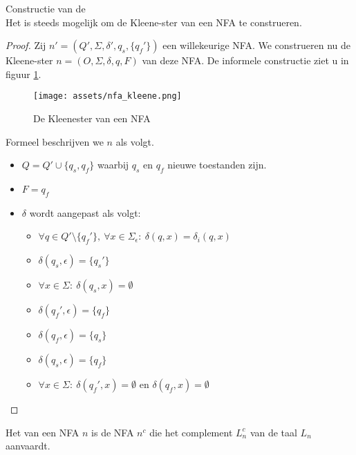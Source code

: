 \documentclass[main.tex]{subfiles}
\begin{document}
\begin{st}
  \label{st:ster-nfa}
  Constructie van de \\
  Het is steeds mogelijk om de Kleene-ster van een NFA te construeren.

  \begin{proof}
    Zij $n' = (Q',\Sigma,\delta',q_{s},\{q_{f}'\})$ een willekeurige NFA. We construeren nu de Kleene-ster $n = (O,\Sigma,\delta,q,F)$ van deze NFA.
    De informele constructie ziet u in figuur \ref{fig:nfa_kleene}.
    \begin{figure}[H]
      \centering
      \texttt{[image: assets/nfa\_kleene.png]}      
      \caption{De Kleenester van een NFA}
      \label{fig:nfa_kleene}
    \end{figure}
    Formeel beschrijven we $n$ als volgt.
    \begin{itemize}
    \item $Q = Q' \cup \{ q_{s}, q_{f} \}$ waarbij $q_{s}$ en $q_{f}$ nieuwe toestanden zijn.
    \item $F = {q_{f}}$
    \item $\delta$ wordt aangepast als volgt:
      \begin{itemize}
      \item $\forall q \in Q'\setminus\{q_{f}'\},\ \forall x \in \Sigma_{\epsilon}:\ \delta(q,x) = \delta_{i}(q,x)$
      \item $\delta(q_{s},\epsilon) = \{q_{s}'\}$
      \item $\forall x \in \Sigma:\ \delta(q_{s},x) = \emptyset$
      \item $\delta(q_{f}',\epsilon) = \{q_{f}\}$
      \item $\delta(q_{f},\epsilon) = \{q_{s}\}$
      \item $\delta(q_{s},\epsilon) = \{q_{f}\}$
      \item $\forall x \in \Sigma:\ \delta(q_{f}',x) = \emptyset$ en $\delta(q_{f},x) = \emptyset$
      \end{itemize}
    \end{itemize}
  \end{proof}
\end{st}

\begin{de}
  Het  van een NFA $n$ is de NFA $n^{c}$ die het complement $L_{n}^{c}$ van de taal $L_{n}$ aanvaardt.
\end{de}
\end{document}
